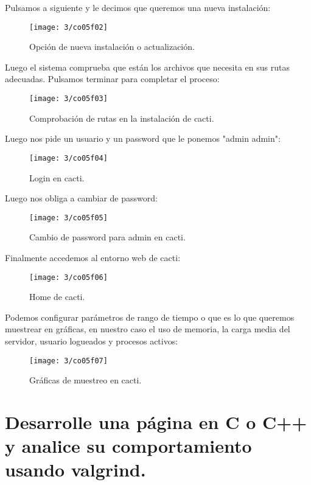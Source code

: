 Pulsamos a siguiente y le decimos que queremos una nueva instalación:

\begin{figure}[H]
	\centering
	\texttt{[image: 3/co05f02]}
	\caption{Opción de nueva instalación o actualización.}
	\label{fig:f23}
\end{figure}

Luego el sistema comprueba que están los archivos que necesita en sus rutas adecuadas. Pulsamos terminar para completar el proceso:

\begin{figure}[H]
	\centering
	\texttt{[image: 3/co05f03]}
	\caption{Comprobación de rutas en la instalación de cacti.}
	\label{fig:f24}
\end{figure}

Luego nos pide un usuario y un password que le ponemos "admin admin":

\begin{figure}[H]
	\centering
	\texttt{[image: 3/co05f04]}
	\caption{Login en cacti.}
	\label{fig:f25}
\end{figure}

Luego nos obliga a cambiar de password:

\begin{figure}[H]
	\centering
	\texttt{[image: 3/co05f05]}
	\caption{Cambio de password para admin en cacti.}
	\label{fig:f26}
\end{figure}

Finalmente accedemos al entorno web de cacti:
\begin{figure}[H]
	\centering
	\texttt{[image: 3/co05f06]}
	\caption{Home de cacti.}
	\label{fig:f27}
\end{figure}

Podemos configurar parámetros de rango de tiempo o que es lo que queremos muestrear en gráficas, en nuestro caso el uso de memoria, la carga media del servidor, usuario logueados y procesos activos:
\begin{figure}[H]
	\centering
	\texttt{[image: 3/co05f07]}
	\caption{Gráficas de muestreo en cacti.}
	\label{fig:f28}
\end{figure}

\section{Desarrolle una página en C o C++ y analice su comportamiento usando valgrind.}

